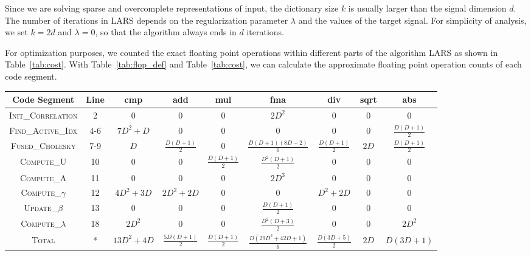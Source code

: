 Since we are solving sparse and overcomplete representations of input, the dictionary size $k$ is usually larger than the signal dimension $d$. The number of iterations in LARS depends on the regularization parameter $\lambda$ and the values of the target signal. For simplicity of analysis, we set $k = 2d$ and $\lambda = 0$, so that the algorithm always ends in $d$ iterations. 

For optimization purposes, we counted the exact floating point operations within different parts of the algorithm LARS as shown in Table~\ref{tab:cost}. With Table~\ref{tab:flop_def} and Table~\ref{tab:cost}, we can calculate the approximate floating point operation counts of each code segment.


\begin{table*}[ht!]
\centering
\begin{tabular}{|c || c | c | c | c | c | c | c | c |}
\hline
 Code Segment & Line & cmp & add & mul & fma & div & sqrt & abs \\
\hline\hline
\textsc{Init\_Correlation} & 2 & 0 & 0 & 0 & $2D^2$ & 0 & 0 & 0 \\ 
\textsc{Find\_Active\_Idx} & 4-6 & $7D^2+D$ & 0 & 0 & 0 & 0 & 0 & $\frac{D(D+1)}{2}$ \\
\textsc{Fused\_Cholesky} & 7-9 & $D$ & $\frac{D(D+1)}{2}$ & 0 & $\frac{D(D+1)(8D-2)}{6}$ & $\frac{D(D+1)}{2}$ & $2D$ & $\frac{D(D+1)}{2}$ \\
\textsc{Compute\_U} & 10 & 0 & 0 & $\frac{D(D+1)}{2}$ & $\frac{D^2(D+1)}{2}$ & 0 & 0 & 0  \\
\textsc{Compute\_A} & 11 & 0 & 0 & 0 & $2D^3$ & 0 & 0 & 0  \\
\textsc{Compute\_$\gamma$} & 12 & $4D^2+3D$ & $2D^2+2D$ & 0 & 0 & $D^2+2D$ & 0 & 0  \\
\textsc{Update\_$\beta$} & 13 & 0 & 0 & 0 & $\frac{D(D+1)}{2}$ & 0 & 0 & 0  \\
\textsc{Compute\_$\lambda$} & 18 & $2D^2$ & 0 & 0 & $\frac{D^2(D+3)}{2}$ & 0 & 0 & $2D^2$  \\
\hline
\textsc{Total} & * & $13D^2+4D$ & $\frac{5D(D+1)}{2}$ & $\frac{D(D+1)}{2}$ & $\frac{D(29D^2+42D+1)}{6}$ & $\frac{D(3D+5)}{2}$ & $2D$ & $D(3D+1)$  \\
\hline
\end{tabular}
\caption{Cost analysis on each code segments of Algorithm~\ref{alg:lars}. $D$ is the dimension of the target signal.}
\label{tab:cost}
\end{table*}


